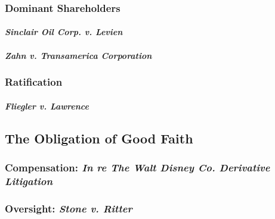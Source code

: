 
\subsubsection{Dominant Shareholders}

\paragraph{\emph{Sinclair Oil Corp. v. Levien}}


\paragraph{\emph{Zahn v. Transamerica Corporation}}


\subsubsection{Ratification}

\paragraph{\emph{Fliegler v. Lawrence}}


\subsection{The Obligation of Good Faith}

\subsubsection{Compensation: \emph{In re The Walt Disney Co. Derivative Litigation}}


\subsubsection{Oversight: \emph{Stone v. Ritter}}

